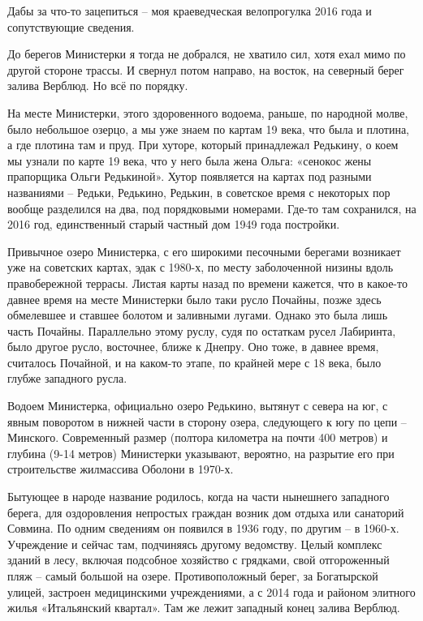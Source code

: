 Дабы за что-то зацепиться – моя краеведческая велопрогулка 2016 года и сопутствующие сведения. 

До берегов Министерки я тогда не добрался, не хватило сил, хотя ехал мимо по другой стороне трассы. И свернул потом направо, на восток, на северный берег залива Верблюд. Но всё по порядку.

На месте Министерки, этого здоровенного водоема, раньше, по народной молве, было небольшое озерцо, а мы уже знаем по картам 19 века, что была и плотина, а где плотина там и пруд. При хуторе, который принадлежал Редькину, о коем мы узнали по карте 19 века, что у него была жена Ольга: «сенокос жены прапорщика Ольги Редькиной». Хутор появляется на картах под разными названиями – Редьки, Редькино, Редькин, в советское время с некоторых пор вообще разделился на два, под порядковыми номерами. Где-то там сохранился, на 2016 год, единственный старый частный дом 1949 года постройки. 

Привычное озеро Министерка, с его широкими песочными берегами возникает уже на советских картах, эдак с 1980-х, по месту заболоченной низины вдоль правобережной террасы. Листая карты назад по времени кажется, что в какое-то давнее время на месте Министерки было таки русло Почайны, позже здесь обмелевшее и ставшее болотом и заливными лугами. Однако это была лишь часть Почайны. Параллельно этому руслу, судя по остаткам русел Лабиринта, было другое русло, восточнее, ближе к Днепру. Оно тоже, в давнее время, считалось Почайной, и на каком-то этапе, по крайней мере с 18 века, было глубже западного русла. 

Водоем Министерка, официально озеро Редькино, вытянут с севера на юг, с явным поворотом в нижней части в сторону озера, следующего к югу по цепи – Минского. Современный размер (полтора километра на почти 400 метров) и глубина (9-14 метров) Министерки указывают, вероятно, на разрытие его при строительстве жилмассива Оболони в 1970-х.

Бытующее в народе название родилось, когда на части нынешнего западного берега, для оздоровления непростых граждан возник дом отдыха или санаторий Совмина. По одним сведениям он появился в 1936 году, по другим – в 1960-х. Учреждение и сейчас там, подчиняясь другому ведомству. Целый комплекс зданий в лесу, включая подсобное хозяйство с грядками, свой отгороженный пляж – самый большой на озере. Противоположный берег, за Богатырской улицей, застроен медицинскими учреждениями, а с 2014 года и районом элитного жилья «Итальянский квартал». Там же лежит западный конец залива Верблюд.

